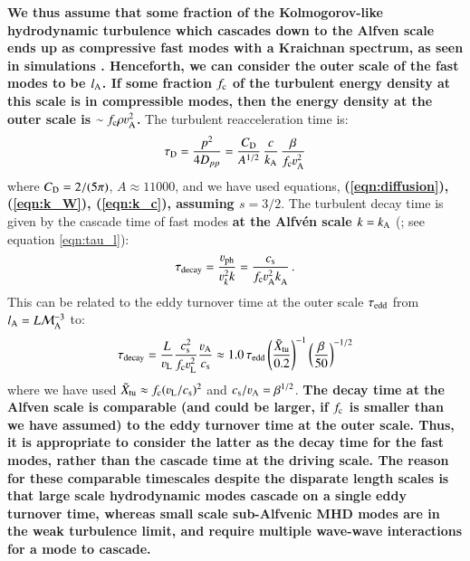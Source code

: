 \documentclass[fleqn,usenatbib,useAMS]{mnras}
\newcommand\C[1]{{\bf #1}}
\begin{document}
\C{We thus assume that some fraction of the Kolmogorov-like hydrodynamic turbulence which cascades down to the Alfven scale ends up as compressive fast modes with a Kraichnan spectrum, as seen in simulations \citep{cho03}. Henceforth, we can consider the outer scale of the fast modes to be $l_{\rm A}$. If some fraction $f_{\rm c}$ of the turbulent energy density at this scale is in compressible modes, then the energy density at the outer scale is $\sim f_{\rm c} \rho \varv_{\rm A}^{2}$.}
The turbulent reacceleration time is: 
\C{
  \begin{equation}
\tau_{\rm D} = \frac{p^{2}}{4 D_{pp}} = \frac{C_{\rm D}}{A^{1/2}}\, \frac{c}{k_{\rm A}}\, \frac{\beta}{f_{\rm c} \varv_{\rm A}^{2}}
\label{eqn:tau_D} 
\end{equation}
}
where $C_{\rm D} = 2/(5 \pi)$, $A\approx 11000$, and we have used equations, \C{(\ref{eqn:diffusion}), (\ref{eqn:k_W}), (\ref{eqn:k_c}), assuming $s=3/2$}. The turbulent decay time is given by the cascade time of fast modes \C{at the Alfv\'en scale $k=k_{{\mathrm{A}}}$} (\citealt{2004ApJ...614..757Y}; see equation \ref{eqn:tau_l}): 
\begin{equation}
  \tau_{\rm decay} = \frac{\varv_{\rm ph}}{\varv_k^{2} k} = 
\frac{c_{\rm s}}{f_{\rm c} \varv_{\rm A}^{2} k_{\rm A}^{}}\,.
\label{eqn:tau_decay} 
\end{equation}
This can be related to the eddy turnover time at the outer scale $\tau_{\rm edd}$ from $l_{\rm A} = L \mathcal{M}_{\rm A}^{-3}$ to: 
\begin{equation}
\tau_{\rm decay} =\frac{L}{\varv_{\rm L}} \frac{c_{\rm s}^{2}}{f_{\rm c} \varv_{\rm L}^{2}}  \frac{\varv_{\rm A}}{c_{\rm s}} \approx  1.0 \, \tau_{\rm edd} \left(\frac{\tilde{X}_{\rm tu}}{0.2}\right)^{-1}  \left(\frac{\beta}{50} \right)^{-1/2}
\end{equation}
where we have used $\tilde{X}_{\rm tu} \approx f_{\rm c} (\varv_{\rm L}/c_{\rm s})^{2}$ and $c_{\rm s}/\varv_{\rm A} = \beta^{1/2}$. \C{The decay time at the Alfven scale is comparable (and could be larger, if $f_{\rm c}$ is smaller than we have assumed) to the eddy turnover time at the outer scale. Thus, it is appropriate to consider the latter as the decay time for the fast modes, rather than the cascade time at the driving scale. The reason for these comparable timescales despite the disparate length scales is that large scale hydrodynamic modes cascade on a single eddy turnover time, whereas small scale sub-Alfvenic MHD modes are in the weak turbulence limit, and require multiple wave-wave interactions for a mode to cascade.  }
\end{document}
